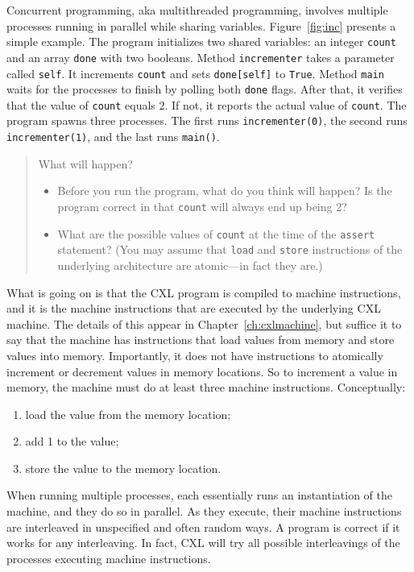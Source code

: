 \documentclass{report}
\begin{document}
Concurrent programming, aka multithreaded programming, involves multiple
processes running in parallel while sharing variables.
Figure~\ref{fig:inc} presents a simple example.
The program
initializes two shared variables: an integer \texttt{count} and
an array \texttt{done} with two booleans.
Method \texttt{incrementer} takes a parameter called \texttt{self}.
It increments \texttt{count} and sets \texttt{done[self]} to \texttt{True}.
Method \texttt{main} waits for the processes to finish by polling
both \texttt{done} flags.
After that, it verifies that the value of \texttt{count} equals 2.  If not,
it reports the actual value of \texttt{count}.
The program spawns three processes.
The first runs \texttt{incrementer(0)}, the second runs
\texttt{incrementer(1)}, and the last runs \texttt{main()}.

\begin{quote}
What will happen?
\begin{itemize}
\item Before you run the program, what do you think will happen?  Is the
program correct in that \texttt{count} will always end up being 2?
\item What are the possible values of \texttt{count} at the time of the
\texttt{assert} statement?
(You may assume that \texttt{load} and \texttt{store} instructions of the
underlying architecture are atomic---in fact they are.)
\end{itemize}
\end{quote}

What is going on is that the CXL program is compiled to machine instructions,
and it is the machine instructions that are executed by the underlying CXL
machine.  The details of this appear in Chapter~\ref{ch:cxlmachine},
but suffice it to
say that the machine has instructions that load values from memory and store
values into memory.  Importantly, it does not have instructions to atomically
increment or decrement values in memory locations.
So to increment a value in memory,
the machine must do at least three machine instructions.  Conceptually:
\begin{enumerate}
\item load the value from the memory location;
\item add 1 to the value;
\item store the value to the memory location.
\end{enumerate}

When running multiple processes, each essentially runs an instantiation of
the machine, and they do so in parallel.  As they execute, their machine
instructions are interleaved in unspecified and often random ways.
A program is correct if it works for any interleaving.
In fact, CXL will try all possible interleavings of the processes
executing machine instructions.
\end{document}
